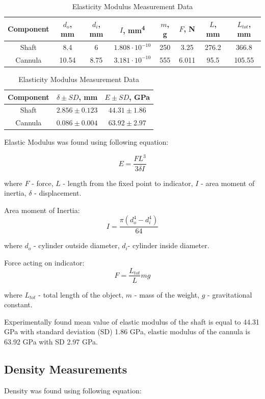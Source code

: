 \begin{table}
\caption {Elasticity Modulus Measurement Data} \label{tab:elasMod} 
\begin{tabular}{ | c | c | c | c | c | c | c | c | } 
\hline
Component & $d_o$, mm & $d_i$, mm & $I$, mm\textsuperscript{4} & $m$, g & $F$, N & $L$, mm & $L_{tot}$, mm \\ 
\hline
Shaft & 8.4 & 6 & $1.808 \cdot 10^{-10}$ & 250 & 3.25 & 276.2 & 366.8\\ 
\hline
Cannula & 10.54 & 8.75 & $3.181 \cdot 10^{-10}$ & 555 & 6.011 & 95.5 & 105.55 \\ 
\hline
\end{tabular}

\begin{tabular}{ | c | c | c | } 
\hline
Component & $\delta \pm SD$, mm & $E \pm SD$, GPa \\ 
\hline
Shaft & $2.856 \pm 0.123$ & $44.31 \pm 1.86$ \\ 
\hline
Cannula & $0.086 \pm 0.004$ & $63.92 \pm 2.97$ \\ 
\hline
\end{tabular}
\end{table}

Elastic Modulus was found using following equation:

\begin{equation}
E = \frac{FL^3}{3 \delta I} 
\end{equation}

where $F$ - force, $L$ - length from the fixed point to indicator, $I$ - area moment of inertia, $\delta$ - displacement.

Area moment of Inertia: 
\begin{equation}
I = \frac{\pi (d_o^4 - d_i^4)}{64}
\end{equation}

where $d_o$ - cylinder outside diameter, $d_i$- cylinder inside diameter.

Force acting on indicator:
\begin{equation}
F = \frac{L_{tot}}{L}mg
\end{equation}

where $L_{tot}$ - total length of the object, $m$ - mass of the weight, $g$ - gravitational constant.

Experimentally found mean value of elastic modulus of the shaft is equal to 44.31 GPa with standard deviation (SD) 1.86 GPa, elastic modulus of the cannula is 63.92 GPa with SD 2.97 GPa.

	\subsection{Density Measurements}
	\label{sec:DenMeas}
Density was found using following equation:

